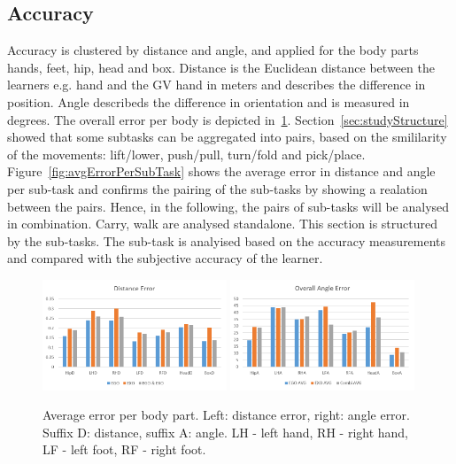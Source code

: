\subsection{Accuracy}
Accuracy is clustered by distance and angle, and applied for the body parts hands, feet, hip, head and box. Distance is the Euclidean distance between the learners e.g. hand and the GV hand in meters and describes the difference in position. Angle describeds the difference in orientation and is measured in degrees. The overall error per body is depicted in~\ref{fig:overallError}.
Section~\ref{sec:studyStructure} showed that some subtasks can be aggregated into pairs, based on the smililarity of the movements: lift/lower, push/pull, turn/fold and pick/place. Figure~\ref{fig:avgErrorPerSubTask} shows the average error in distance and angle per sub-task and confirms the pairing of the sub-tasks by showing a realation between the pairs. Hence, in the following, the pairs of sub-tasks will be analysed in combination. Carry, walk are analysed standalone. This section is structured by the sub-tasks. The sub-task is analyised based on the accuracy measurements and compared with the subjective accuracy of the learner.
\begin{figure}[H]
	\centering
	\includegraphics[width=0.49\textwidth]{figures/overallDistanceError.png}
	\includegraphics[width=0.49\textwidth]{figures/overallAngleError.png}
	\caption[Average error per body part in meter.]{Average error per body part. Left: distance error, right: angle error. Suffix D: distance, suffix A: angle. LH - left hand, RH - right hand, LF - left foot, RF - right foot.}
	\label{fig:overallError}
\end{figure}
